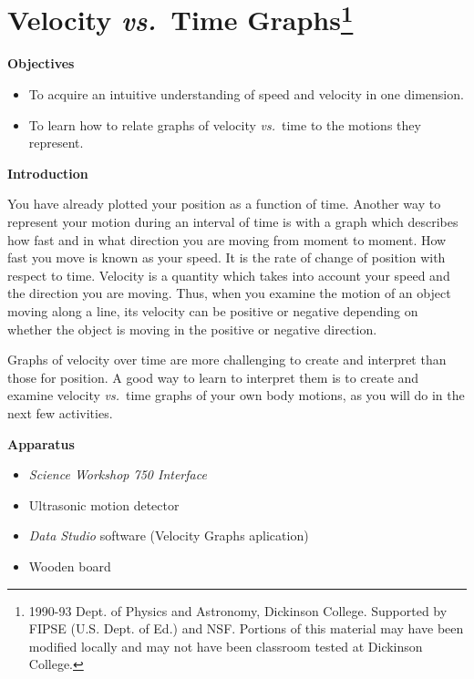 
\section{Velocity \textit{vs.}~Time Graphs\footnote{
1990-93 Dept. of Physics and Astronomy, Dickinson College. Supported by FIPSE
(U.S. Dept. of Ed.) and NSF. Portions of this material may have been modified
locally and may not have been classroom tested at Dickinson College.
}}

\makelabheader %

\textbf{Objectives }

\begin{itemize}
\item To acquire an intuitive understanding of speed and velocity in one dimension. 
\item To learn how to relate graphs of velocity \textit{vs.}~time to the motions they represent.
\end{itemize}
\textbf{Introduction} 

You have already plotted your position as a function of time. Another way to
represent your motion during an interval of time is with a graph which describes
how fast and in what direction you are moving from moment to moment. How fast
you move is known as your speed. It is the rate of change of position with respect
to time. Velocity is a quantity which takes into account your speed and the
direction you are moving. Thus, when you examine the motion of an object moving
along a line, its velocity can be positive or negative depending
on whether the object is moving in the positive or negative direction.

Graphs of velocity over time are more challenging to create and interpret than
those for position. A good way to learn to interpret them is to create and examine velocity \textit{vs.}~time graphs of your own body motions, as you will do in the next few activities.

\textbf{Apparatus}

\begin{itemize}
\item \textit{Science Workshop 750 Interface}
\item Ultrasonic motion detector
\item \textit{Data Studio} software (Velocity Graphs aplication)
\item Wooden board
\end{itemize}

